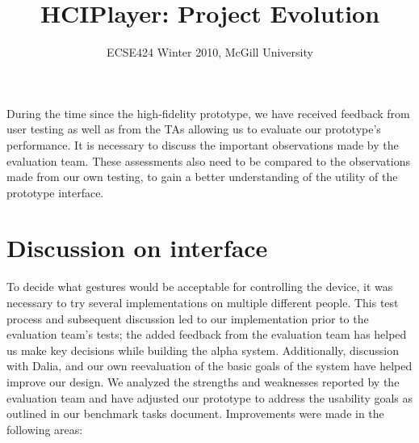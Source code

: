\documentclass[10pt,letterpaper]{article}
\begin{document}
\title{HCIPlayer: Project Evolution}
\author{ECSE424 Winter 2010, McGill University}
\renewcommand{\today}{March 24th, 2010}
\maketitle

During the time since the high-fidelity prototype, we have received feedback from user testing as well as from the TAs allowing us to evaluate our prototype's performance. It is necessary to discuss the important observations made by the evaluation team. These assessments also need to be compared to the observations made from our own testing, to gain a better understanding of the utility of the prototype interface.

\section*{Discussion on interface}
To decide what gestures would be acceptable for controlling the device, it was necessary to try several implementations on multiple different people. This test process and subsequent discussion led to our implementation prior to the evaluation team's tests; the added feedback from the evaluation team has helped us make key decisions while building the alpha system. Additionally, discussion with Dalia, and our own reevaluation of the basic goals of the system have helped improve our design. We analyzed the strengths and weaknesses reported by the evaluation team and have adjusted our prototype to address the usability goals as outlined in our benchmark tasks document. Improvements were made in the following areas:
\end{document}
